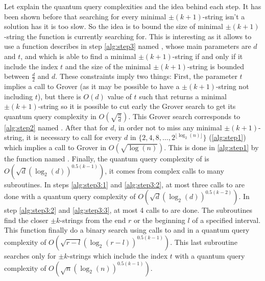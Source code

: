 \begin{itemize}
          Let explain the quantum query complexities and the idea behind each step. It has been shown before
          that searching for every minimal $\pm(k+1)$-string isn't a solution has it is too slow. So the idea
          is to bound the size of minimal $\pm(k+1)$-string the function is currently searching for. This is interesting
          as it allows to use a function describes in step \ref{alg:step3} named , whose main parameters are $d$ and $t$, and which is able to
          find a minimal $\pm(k+1)$-string if and only if it include the index $t$ and the size of the minimal $\pm(k+1)$-string
          is bounded between $\frac{d}{2}$ and $d$. These constraints imply two things:
          First, the parameter $t$ implies a call to Grover (as it may be possible to have a $\pm(k+1)$-string  not including $t$), but
          there is $O(d)$ value of $t$ such that  returns a minimal $\pm(k+1)$-string so it is possible
          to cut early the Grover search to get its quantum query complexity in $O\left(\sqrt{\frac{n}{d}}\right)$.
          This Grover search corresponds to \autoref{alg:step2} named .
          After that for $d$, in order not to miss any minimal $\pm(k+1)$-string, it is necessary to call 
          for every $d$ in $\{2, 4, 8, \ldots, 2^{\lfloor \log_2(n) \rfloor}\}$ (\autoref{alg:step1}) which implies a
          call to Grover in $O\left(\sqrt{\log(n)}\right)$. This is done in \autoref{alg:step1} by the function named
          .
          Finally, the quantum query complexity of  is $O\left(\sqrt{d}(\log_2(d))^{0.5(k-1)}\right)$, it comes from
          complex calls to many subroutines. In steps \ref{alg:step3:1} and \ref{alg:step3:2}, at most
          three calls to  are done with a quantum query complexity of $O\left(\sqrt{d}(\log_2(d))^{0.5(k-2)}\right)$.
          In step \ref{alg:step3:2} and \ref{alg:step3:3}, at most 4 calls to  are done. The
          subroutines  find the closer $\pm k$-strings from the end $r$ or the beginning $l$ of a
          specified interval. This function finally do a binary search using calls to 
          and  in a quantum query complexity of $O\left(\sqrt{r-l}(\log_2(r-l))^{0.5(k-1)}\right)$.
          This last subroutine  searches only for $\pm k$-strings which include the index $t$
          with a quantum query complexity of $O\left(\sqrt{n}(\log_2(n))^{0.5(k-1)}\right)$.

          \begin{figure}[h!]
              \centering
\end{figure}
\end{itemize}

